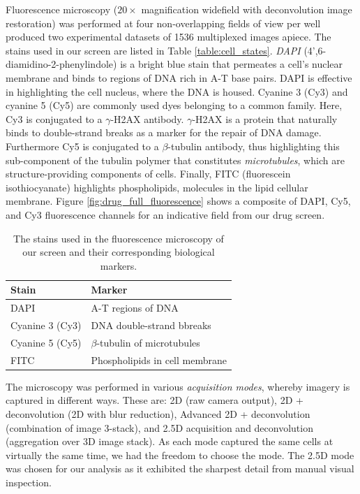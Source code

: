 Fluorescence microscopy ($20\times$ magnification widefield with deconvolution image restoration) was performed at four non-overlapping fields of view per well produced two experimental datasets of 1536 multiplexed images apiece. The stains used in our screen are listed in Table \ref{table:cell_states}. \emph{DAPI} (4',6-diamidino-2-phenylindole) is a bright blue stain that permeates a cell's nuclear membrane and binds to regions of DNA rich in A-T base pairs. DAPI is effective in highlighting the cell nucleus, where the DNA is housed. Cyanine 3 (Cy3) and cyanine 5 (Cy5) are commonly used dyes belonging to a common family. Here, Cy3 is conjugated to a $\gamma$-H2AX antibody. $\gamma$-H2AX is a protein that naturally binds to double-strand breaks as a marker for the repair of DNA damage. Furthermore Cy5 is conjugated to a $\beta$-tubulin antibody, thus highlighting this sub-component of the tubulin polymer that constitutes \emph{microtubules}, which are structure-providing components of cells. Finally, FITC (fluorescein isothiocyanate) highlights phospholipids, molecules in the lipid cellular membrane. Figure \ref{fig:drug_full_fluorescence} shows a composite of DAPI, Cy5, and Cy3 fluorescence channels for an indicative field from our drug screen.

\begin{table}
\begin{center}
\begin{tabular}{|l|l|}
\hline
Stain & Marker \\
\hline
DAPI &  A-T regions of DNA\\
\hline
Cyanine 3 (Cy3) &DNA double-strand bbreaks\\
\hline
Cyanine 5 (Cy5) & $\beta$-tubulin of microtubules\\
\hline
FITC & Phospholipids in cell membrane\\
\hline
\end{tabular}
\caption{The stains used in the fluorescence microscopy of our screen and their corresponding biological markers.}
\label{table:stains}
\end{center}
\end{table}

The microscopy was performed in various \emph{acquisition modes}, whereby imagery is captured in different ways. These are: 2D (raw camera output), 2D + deconvolution (2D with blur reduction), Advanced 2D + deconvolution (combination of image 3-stack), and 2.5D acquisition and deconvolution (aggregation over 3D image stack). As each mode captured the same cells at virtually the same time, we had the freedom to choose the mode. The 2.5D mode was chosen for our analysis as it exhibited the sharpest detail from manual visual inspection.

